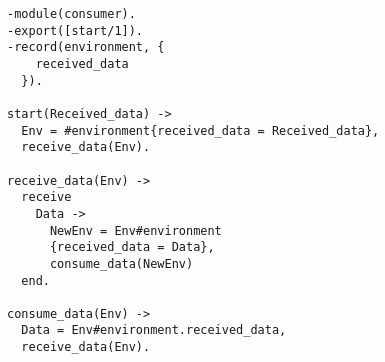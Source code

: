 \begin{verbatim}
-module(consumer).
-export([start/1]).
-record(environment, {
    received_data
  }).

start(Received_data) ->
  Env = #environment{received_data = Received_data},
  receive_data(Env).

receive_data(Env) ->
  receive
    Data ->
      NewEnv = Env#environment
      {received_data = Data},
      consume_data(NewEnv)
  end.

consume_data(Env) ->
  Data = Env#environment.received_data,
  receive_data(Env).
\end{verbatim}
